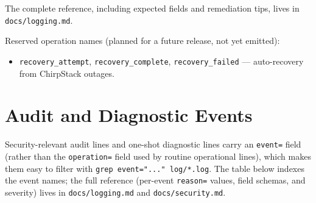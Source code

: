 The complete reference, including expected fields and remediation tips, lives in \texttt{docs/logging.md}.

Reserved operation names (planned for a future release, not yet emitted):

\begin{itemize}
\item
  \texttt{recovery\_attempt}, \texttt{recovery\_complete}, \texttt{recovery\_failed} --- auto-recovery from ChirpStack outages.
\end{itemize}

\chapter{Audit and Diagnostic Events}\label{app-audit-events}

Security-relevant audit lines and one-shot diagnostic lines carry an \texttt{event=} field (rather than the \texttt{operation=} field used by routine operational lines), which makes them easy to filter with \texttt{grep\ \textquotesingle{}event="..."\textquotesingle{}\ log/*.log}. The table below indexes the event names; the full reference (per-event \texttt{reason=} values, field schemas, and severity) lives in \texttt{docs/logging.md} and \texttt{docs/security.md}.

